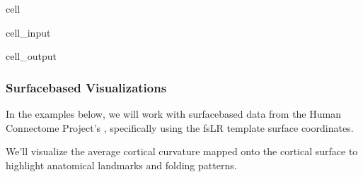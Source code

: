 \documentclass[letterpaper,10pt,english]{jupyterBook}
\begin{document}
\begin{sphinxuseclass}{cell}\begin{sphinxVerbatimInput}

\begin{sphinxuseclass}{cell_input}
\begin{sphinxVerbatim}[commandchars=\\\{\}]
\end{sphinxVerbatim}

\end{sphinxuseclass}\end{sphinxVerbatimInput}
\begin{sphinxVerbatimOutput}

\begin{sphinxuseclass}{cell_output}
\noindent{}

\end{sphinxuseclass}\end{sphinxVerbatimOutput}

\end{sphinxuseclass}

\subsubsection{Surface\sphinxhyphen{}based Visualizations}
\label{\detokenize{chapters/03/03c_visualization-examples:surface-based-visualizations}}
\sphinxAtStartPar
In the examples below, we will work with surface\sphinxhyphen{}based data from the Human Connectome Project’s , specifically using the fsLR template surface coordinates.

\sphinxAtStartPar
We’ll visualize the average cortical curvature mapped onto the cortical surface to highlight anatomical landmarks and folding patterns.
\end{document}
